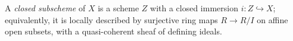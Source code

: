 
A \emph{closed subscheme} of $X$ is a scheme $Z$ with a closed immersion $i:Z\hookrightarrow X$; equivalently, it is locally described by surjective ring maps $R\to R/I$ on affine open subsets, with a quasi-coherent sheaf of defining ideals.
